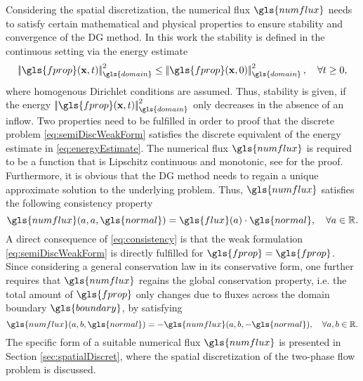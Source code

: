 Considering the spatial discretization, the numerical flux $\gls{numflux}$ needs to satisfy certain mathematical and physical properties to ensure stability and convergence of the DG method. In this work the stability is defined in the continuous setting via the energy estimate 
\begin{equation}
\norm{\gls{fprop}(\vectr{x},t)}_{\gls{domain}}^2 \leq \norm{\gls{fprop}(\vectr{x},0)}_{\gls{domain}}^2, \quad \forall t \geq 0,
\label{eq:energyEstimate}
\end{equation}
where homogenous Dirichlet conditions are assumed. Thus, stability is given, if the energy  $\norm{\gls{fprop}(\vectr{x},t)}_{\gls{domain}}^2$ only decreases in the absence of an inflow. 
Two properties need to be fulfilled in order to proof that the discrete problem \eqref{eq:semiDiscWeakForm} satisfies the discrete equivalent of the energy estimate in \eqref{eq:energyEstimate}. The numerical flux $\gls{numflux}$ is required to be a function that is Lipschitz continuous and monotonic, see \textcite{di_pietro_mathematical_2012} for the proof. Furthermore, it is obvious that the DG method needs to regain a unique approximate solution to the underlying problem. Thus, $\gls{numflux}$ satisfies the following consistency property 
\begin{equation}
\gls{numflux}(a,a,\gls{normal}) = \gls{flux}(a) \cdot \gls{normal}, \quad \forall a \in \mathbb{R}. 
\label{eq:consistency}
\end{equation}
A direct consequence of \eqref{eq:consistency} is that the weak formulation \eqref{eq:semiDiscWeakForm} is directly fulfilled for $\gls{fprop} = \gls{fprop}$. Since considering a general conservation law in its conservative form, one further requires that $\gls{numflux}$ regains the global conservation property, i.e. the total amount of $\gls{fprop}$ only changes due to fluxes across the domain boundary $\gls{boundary}$, by satisfying     
\begin{equation}
\gls{numflux}(a,b,\gls{normal}) = -\gls{numflux}(a,b,-\gls{normal}), \quad \forall a,b \in \mathbb{R}. 
\label{eq:conservativity}
\end{equation}
The specific form of a suitable numerical flux $\gls{numflux}$ is presented in Section \ref{sec:spatialDiscret}, where the spatial discretization of the two-phase flow problem is discussed. 


